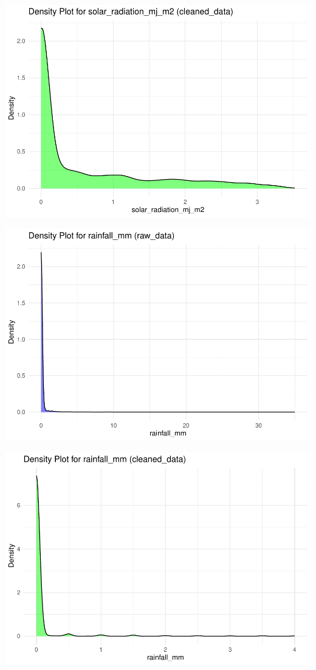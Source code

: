 \documentclass[
  11pt,
  letterpaper,
]{article}
\begin{document}
\begin{center}\includegraphics[width=1.2\linewidth,]{Final_Project_files/figure-latex/unnamed-chunk-15-14} \end{center}

\begin{center}\includegraphics[width=1.2\linewidth,]{Final_Project_files/figure-latex/unnamed-chunk-15-15} \end{center}

\begin{center}\includegraphics[width=1.2\linewidth,]{Final_Project_files/figure-latex/unnamed-chunk-15-16} \end{center}
\end{document}
